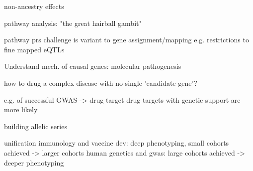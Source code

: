 \begin{outline}
            \4 non-ancestry effects

    \2 pathway analysis: "the great hairball gambit"

    \2 pathway prs
        \3 challenge is variant to gene assignment/mapping
            \4 e.g. restrictions to fine mapped eQTLs

    \2 Understand mech. of causal genes: molecular pathogenesis



%
    \2 how to drug a complex disease with no single 'candidate gene'?


        \3 e.g. of successful GWAS -> drug target
            \4 drug targets with genetic support are more likely

        \3 building allelic series

unification
    immunology and vaccine dev: deep phenotyping, small cohorts achieved -> larger cohorts
    human genetics and gwas: large cohorts achieved -> deeper phenotyping


\end{outline}

